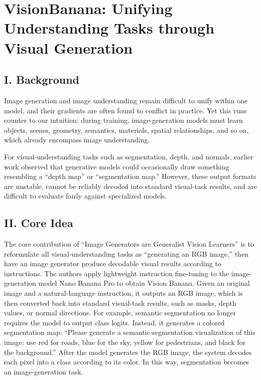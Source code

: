 \setcounter{section}{3}

\hypertarget{visionbanana-unifying-understanding-tasks-through-visual-generation}{%
\section{VisionBanana: Unifying Understanding Tasks through Visual Generation}\label{visionbanana-unifying-understanding-tasks-through-visual-generation}}

\hypertarget{i.-background-8}{%
\subsection{I. Background}\label{i.-background-8}}

Image generation and image understanding remain difficult to unify within one model, and their gradients are often found to conflict in practice. Yet this runs counter to our intuition: during training, image-generation models must learn objects, scenes, geometry, semantics, materials, spatial relationships, and so on, which already encompass image understanding.

For visual-understanding tasks such as segmentation, depth, and normals, earlier work observed that generative models could occasionally draw something resembling a ``depth map'' or ``segmentation map.'' However, these output formats are unstable, cannot be reliably decoded into standard visual-task results, and are difficult to evaluate fairly against specialized models.

\hypertarget{ii.-core-idea-1}{%
\subsection{II. Core Idea}\label{ii.-core-idea-1}}

The core contribution of ``Image Generators are Generalist Vision Learners'' is to reformulate all visual-understanding tasks as ``generating an RGB image,'' then have an image generator produce decodable visual results according to instructions. The authors apply lightweight instruction fine-tuning to the image-generation model Nano Banana Pro to obtain Vision Banana. Given an original image and a natural-language instruction, it outputs an RGB image, which is then converted back into standard visual-task results, such as masks, depth values, or normal directions. For example, semantic segmentation no longer requires the model to output class logits. Instead, it generates a colored segmentation map: ``Please generate a semantic-segmentation visualization of this image: use red for roads, blue for the sky, yellow for pedestrians, and black for the background.'' After the model generates the RGB image, the system decodes each pixel into a class according to its color. In this way, segmentation becomes an image-generation task.


